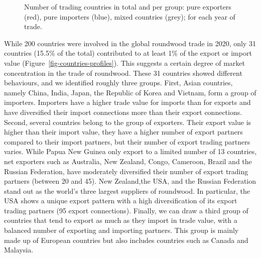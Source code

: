 \documentclass[
  authoryear,
  review,
  3p]{elsarticle}
\begin{document}
\begin{figure}[t]


\caption{\label{fig-network-composition}Number of trading countries in
total and per group: pure exporters (red), pure importers (blue), mixed
countries (grey); for each year of trade.}

\end{figure}%

While 200 countries were involved in the global roundwood trade in 2020,
only 31 countries (15.5\% of the total) contributed to at least 1\% of
the export or import value (Figure~\ref{fig-countries-profiles}). This
suggests a certain degree of market concentration in the trade of
roundwood. These 31 countries showed different behaviours, and we
identified roughly three groups. First, Asian countries, namely China,
India, Japan, the Republic of Korea and Vietnam, form a group of
importers. Importers have a higher trade value for imports than for
exports and have diversified their import connections more than their
export connections. Second, several countries belong to the group of
exporters. Their export value is higher than their import value, they
have a higher number of export partners compared to their import
partners, but their number of export trading partners varies. While
Papua New Guinea only export to a limited number of 13 countries, net
exporters such as Australia, New Zealand, Congo, Cameroon, Brazil and
the Russian Federation, have moderately diversified their number of
export trading partners (between 20 and 45). New Zealand,the USA, and
the Russian Federation stand out as the world's three largest suppliers
of roundwood. In particular, the USA shows a unique export pattern with
a high diversification of its export trading partners (95 export
connections). Finally, we can draw a third group of countries that tend
to export as much as they import in trade value, with a balanced number
of exporting and importing partners. This group is mainly made up of
European countries but also includes countries such as Canada and
Malaysia.
\end{document}
